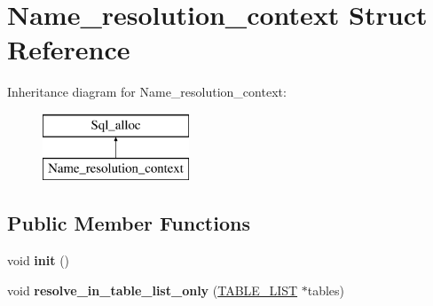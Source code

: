\hypertarget{structName__resolution__context}{}\section{Name\+\_\+resolution\+\_\+context Struct Reference}
\label{structName__resolution__context}
Inheritance diagram for Name\+\_\+resolution\+\_\+context\+:\begin{figure}[H]
\begin{center}
\leavevmode
\includegraphics[height=2.000000cm]{structName__resolution__context}
\end{center}
\end{figure}
\subsection*{Public Member Functions}
\begin{DoxyCompactItemize}
\item 
\mbox{\label{structName__resolution__context_a83b9c5d76b1d9e5ae866b4ee4a9fefcc}} 
void {\bfseries init} ()
\item 
\mbox{\label{structName__resolution__context_a35532feca0e100b872e7be44b852fe02}} 
void {\bfseries resolve\+\_\+in\+\_\+table\+\_\+list\+\_\+only} (\mbox{\hyperlink{structTABLE__LIST}{T\+A\+B\+L\+E\+\_\+\+L\+I\+ST}} $\ast$tables)
\end{DoxyCompactItemize}
